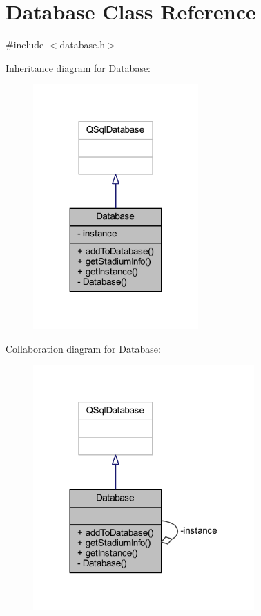 \hypertarget{class_database}{}\section{Database Class Reference}
\label{class_database}


{\ttfamily \#include $<$database.\+h$>$}



Inheritance diagram for Database\+:
\nopagebreak
\begin{figure}[H]
\begin{center}
\leavevmode
\includegraphics[width=179pt]{class_database__inherit__graph}
\end{center}
\end{figure}


Collaboration diagram for Database\+:
\nopagebreak
\begin{figure}[H]
\begin{center}
\leavevmode
\includegraphics[width=240pt]{class_database__coll__graph}
\end{center}
\end{figure}
